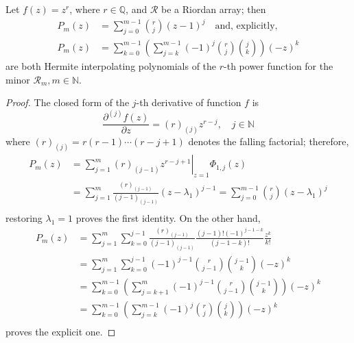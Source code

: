 
\begin{theorem}
\label{thm:pow-Hermite-interpolating-poly-implicit}
Let $f(z)=z^{r}$, where $r\in\mathbb{Q}$, and $\mathcal{R}$ be a Riordan array; then
\begin{equation}
  \label{eq:pow-Hermite-interpolating-poly}
  \begin{split}
  P_{m}(z) &= \sum_{j=0}^{m-1}{\binom{r}{j}}{(z-1)^{j} }
  \quad\text{and, explicitly,}\\
  P_{m}(z) &= \sum_{k=0}^{m-1}{\left(\sum_{j=k}^{m-1}{(-1)^{j}{{r}\choose{j}}{{j}\choose{k}}}\right)(-z)^{k}}
  \end{split}
\end{equation}
are both Hermite interpolating polynomials of the $r$-th power function for the
minor $\mathcal{R}_{m}, m\in\mathbb{N}$.
\end{theorem}

\begin{proof}
The closed form of the $j$-th derivative of function $f$ is 
$$\frac{\partial^{(j)}{f}(z)}{\partial{z}} = (r)_{(j)} z^{r-j}, \quad j\in\mathbb{N}$$ 
where $(r)_{(j)} = r(r-1)\cdots(r-j+1)$ denotes the falling factorial; therefore,
\begin{displaymath}
\begin{split}
  P_{m}(z)  &= \sum_{j=1}^{m}{ \left. (r)_{(j-1)} z^{r-j+1} \right|_{z=1}\Phi_{1,j}(z)} \\
            &= \sum_{j=1}^{m}{\frac{(r)_{(j-1)}}{(j-1)_{(j-1)}}\left(z-\lambda_{1}\right)^{j-1}}
             = \sum_{j=0}^{m-1}{{r \choose j}\left(z-\lambda_{1}\right)^{j}}\\
\end{split}
\end{displaymath}
restoring $\lambda_{1}=1$ proves the first identity. On the other hand,
\begin{displaymath}
\begin{split}
  P_{m}(z)  &= \sum_{j=1}^{m}{\sum_{k=0}^{j-1}{\frac{(r)_{(j-1)}}{(j-1)_{(j-1)}}\frac{(j-1)!(-1)^{j-1-k}}{(j-1-k)!}\frac{z^{k}}{k!}}}\\
            &= \sum_{j=1}^{m}{\sum_{k=0}^{j-1}{(-1)^{j-1}{{r}\choose{j-1}}{{j-1}\choose{k}}(-z)^{k}}} \\
            &= \sum_{k=0}^{m-1}{\left(\sum_{j=k+1}^{m}{(-1)^{j-1}{{r}\choose{j-1}}{{j-1}\choose{k}}}\right)(-z)^{k}}\\
            &= \sum_{k=0}^{m-1}{\left(\sum_{j=k}^{m-1}{(-1)^{j}{{r}\choose{j}}{{j}\choose{k}}}\right)(-z)^{k}}\\
\end{split}
\end{displaymath}
proves the explicit one.
\end{proof}

